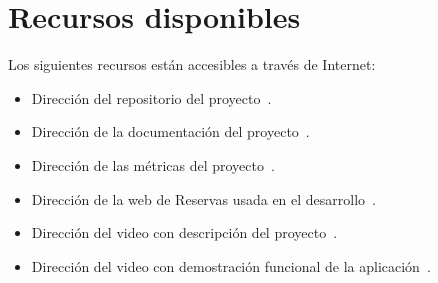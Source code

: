 \section{Recursos disponibles}\label{materiales-adjuntos}

Los siguientes recursos están accesibles a través de Internet: 

\begin{itemize}
\tightlist
\item
	Dirección del repositorio del proyecto~\cite{reservapp:repo}.
\item
	Dirección de la documentación del proyecto~\cite{reservapp:documentacion}.
\item	
	Dirección de las métricas del proyecto~\cite{reservapp:sonarcloud}.
\item	
    Dirección de la web de Reservas usada en el desarrollo~\cite{reservapp:app}.
\item
	Dirección del video con descripción del proyecto~\cite{reservapp:descripcion}.
\item	
	Dirección del video con demostración funcional de la aplicación~\cite{reservapp:demostracion}.
\end{itemize}
